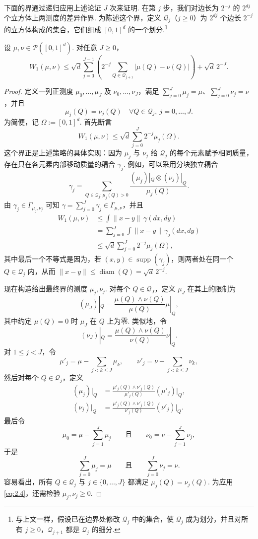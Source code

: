 下面的界通过递归应用上述论证 $J$ 次来证明. 在第 $j$ 步，我们对边长为 $2^{-j}$ 的 $2^{dj}$ 个立方体上两测度的差异作界. 为陈述这个界，定义 $\mathcal Q_j$（$j\ge0$）为 $2^{dj}$ 个边长 $2^{-j}$ 的立方体构成的集合，它们组成 $[0,1]^d$ 的一个划分.\footnote{与上文一样，假设已在边界处修改 $\mathcal Q_j$ 中的集合，使 $\mathcal Q_j$ 成为划分，并且对所有 $j\ge0$，$\mathcal Q_{j+1}$ 都是 $\mathcal Q_j$ 的细分.}
\begin{theorem}[二进划分界]\label{thm:2.2}
设 $\mu,\nu\in\mathcal P([0,1]^d)$. 对任意 $J\ge0$，
$$W_1(\mu,\nu)\le\sqrt d\sum_{j=0}^{J-1}\left(2^{-j}\sum_{Q\in\mathcal Q_{j+1}}|\mu(Q)-\nu(Q)|\right)+\sqrt d\,2^{-J}.$$
\end{theorem}
\begin{proof}
定义一列正测度 $\mu_0,\ldots,\mu_J$ 及 $\nu_0,\ldots,\nu_J$，满足 $\sum_{j=0}^J\mu_j=\mu$、$\sum_{j=0}^J\nu_j=\nu$，并且
$$\mu_j(Q)=\nu_j(Q)\quad\forall Q\in\mathcal Q_j,\ j=0,\ldots,J.$$
为简便，记 $\Omega:=[0,1]^d$. 首先断言
\begin{equation}\label{eq:2.4}
W_1(\mu,\nu)\le\sqrt d\sum_{j=0}^J2^{-j}\mu_j(\Omega).
\end{equation}
这个界正是上述策略的具体实现：因为 $\mu_j$ 与 $\nu_j$ 给 $\mathcal Q_j$ 的每个元素赋予相同质量，存在只在各元素内部移动质量的耦合 $\gamma_j$. 例如，可以采用分块独立耦合
$$\gamma_j=\sum_{Q\in\mathcal Q_j:\mu_j(Q)>0}\frac{(\mu_j)|_Q\otimes(\nu_j)|_Q}{\mu_j(Q)}.$$
由 $\gamma_j\in\Gamma_{\mu_j,\nu_j}$ 可知 $\gamma=\sum_{j=0}^J\gamma_j\in\Gamma_{\mu,\nu}$，并且
$$\begin{aligned}
W_1(\mu,\nu)&\le\int\lVert x-y\rVert\,\gamma(dx,dy)\\
&=\sum_{j=0}^J\int\lVert x-y\rVert\,\gamma_j(dx,dy)\\
&\le\sqrt d\sum_{j=0}^J2^{-j}\mu_j(\Omega),
\end{aligned}$$
其中最后一个不等式是因为，若 $(x,y)\in\operatorname{supp}(\gamma_j)$，则两者处在同一个 $Q\in\mathcal Q_j$ 内，从而 $\lVert x-y\rVert\le\operatorname{diam}(Q)=\sqrt d\,2^{-j}$.

现在构造给出最终界的测度 $\mu_j,\nu_j$. 对每个 $Q\in\mathcal Q_J$，定义 $\mu_J$ 在其上的限制为
$$ (\mu_J)|_Q=\frac{\mu(Q)\wedge\nu(Q)}{\mu(Q)}\mu|_Q,$$
其中约定 $\mu(Q)=0$ 时 $\mu_J$ 在 $Q$ 上为零. 类似地，令
$$ (\nu_J)|_Q=\frac{\mu(Q)\wedge\nu(Q)}{\nu(Q)}\nu|_Q.$$
对 $1\le j<J$，令
$$\mu'_j=\mu-\sum_{j<k\le J}\mu_k,\qquad
\nu'_j=\nu-\sum_{j<k\le J}\nu_k,$$
然后对每个 $Q\in\mathcal Q_j$，定义
$$\begin{aligned}
(\mu_j)|_Q&=\frac{\mu'_j(Q)\wedge\nu'_j(Q)}{\mu'_j(Q)}(\mu'_j)|_Q,\\
(\nu_j)|_Q&=\frac{\mu'_j(Q)\wedge\nu'_j(Q)}{\nu'_j(Q)}(\nu'_j)|_Q.
\end{aligned}$$
最后令
$$\mu_0=\mu-\sum_{j=1}^J\mu_j\qquad\text{且}\qquad\nu_0=\nu-\sum_{j=1}^J\nu_j,$$
于是
$$\sum_{j=0}^J\mu_j=\mu\qquad\text{且}\qquad\sum_{j=0}^J\nu_j=\nu.$$
容易看出，所有 $Q\in\mathcal Q_j$ 与 $j\in\{0,\ldots,J\}$ 都满足 $\mu_j(Q)=\nu_j(Q)$. 为应用 \eqref{eq:2.4}，还需检验 $\mu_j,\nu_j\ge0$.
\end{proof}

